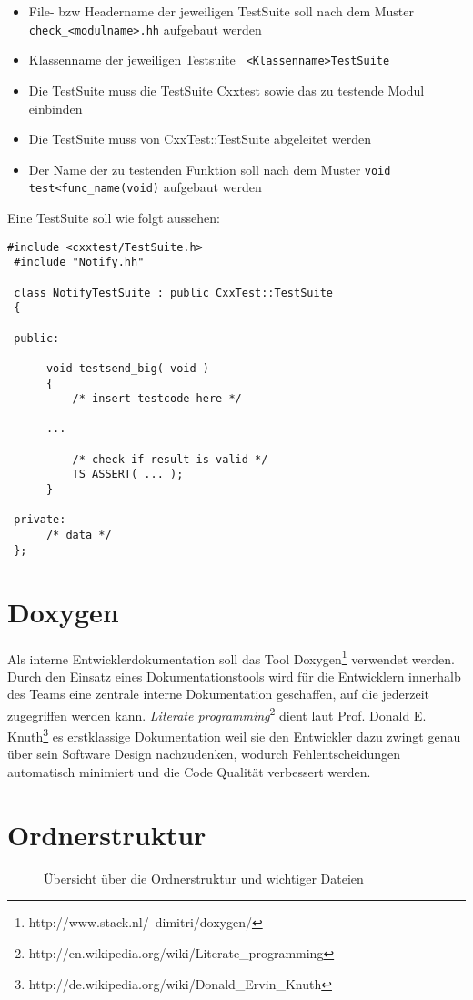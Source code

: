 \begin{itemize}
	\item File- bzw Headername der jeweiligen TestSuite soll nach dem Muster \verb+check_<modulname>.hh+ aufgebaut werden
	\item Klassenname der jeweiligen Testsuite \verb+ <Klassenname>TestSuite+
	\item Die TestSuite muss die TestSuite Cxxtest sowie das zu testende Modul einbinden
	\item Die TestSuite muss von CxxTest::TestSuite abgeleitet werden 
	\item Der Name der zu testenden Funktion soll nach dem Muster \verb+void test<func_name(void)+ aufgebaut werden
\end{itemize}  


Eine TestSuite soll wie folgt aussehen:


\begin{lstlisting}[caption={TestSuite Template check\_notify.hh Beispielcodefragment für die Klasse ,,Notify''},label={lst:cxxtemp}]
 #include <cxxtest/TestSuite.h>
 #include "Notify.hh"
 
 class NotifyTestSuite : public CxxTest::TestSuite
 {
  
 public:
  
      void testsend_big( void )
      {
          /* insert testcode here */
 	  
 	  ...
 	   
          /* check if result is valid */    
          TS_ASSERT( ... );
      }
   
 private:
      /* data */
 };
\end{lstlisting}
\section{Doxygen}
Als interne Entwicklerdokumentation soll das Tool Doxygen\footnote{http://www.stack.nl/~dimitri/doxygen/} verwendet werden.
Durch den Einsatz eines Dokumentationstools wird für die Entwicklern innerhalb des Teams eine zentrale interne Dokumentation geschaffen,
auf die jederzeit zugegriffen werden kann. 
\emph{Literate programming}\footnote{http://en.wikipedia.org/wiki/Literate\_programming} dient laut Prof. Donald E. Knuth\footnote{http://de.wikipedia.org/wiki/Donald\_Ervin\_Knuth} 
es erstklassige Dokumentation weil sie den Entwickler dazu zwingt genau über sein Software Design nachzudenken, wodurch
Fehlentscheidungen automatisch minimiert und die Code Qualität verbessert werden.

\section{Ordnerstruktur}
\begin{figure}[htb!]
    
    \caption{Übersicht über die Ordnerstruktur und wichtiger Dateien}
    \label{src_tree}
\end{figure}

